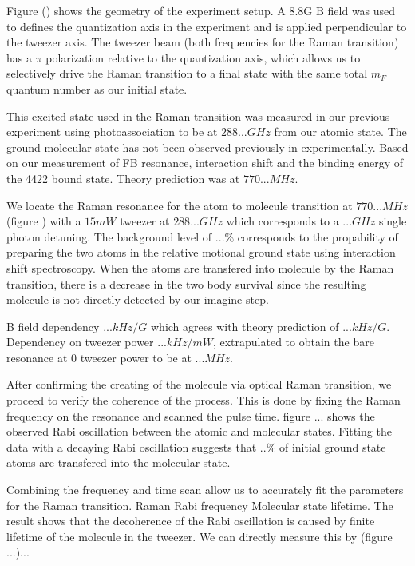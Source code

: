 \documentclass[aps,prl,twocolumn,groupedaddress]{revtex4-1}
\newcommand{\todo}[1]{}
\begin{document}
Figure () shows the geometry of the experiment setup. A $8.8\mathrm{G}$ B field was used to defines the quantization axis in the experiment and is applied perpendicular to the tweezer axis. The tweezer beam (both frequencies for the Raman transition) has a $\pi$ polarization relative to the quantization axis, which allows us to selectively drive the Raman transition to a final state with the same total $m_F$ quantum number as our initial state.


This excited state used in the Raman transition was measured in our previous experiment using photoassociation to be at $288... GHz$ from our atomic state. The ground molecular state has not been observed previously in experimentally. Based on our measurement of FB resonance, interaction shift and the binding energy of the 4422 bound state. Theory prediction was at $770... MHz$. \todo{more, mention/cite Jeremy}


We locate the Raman resonance for the atom to molecule transition at $770... MHz$ (figure \todo{}) with a $15 mW$ tweezer at $288... GHz$ which corresponds to a $... GHz$ single photon detuning.
The background level of $...\%$ corresponds to the propability of preparing the two atoms in the relative motional ground state using interaction shift spectroscopy. When the atoms are transfered into molecule by the Raman transition, there is a decrease in the two body survival since the resulting molecule is not directly detected by our imagine step.
\todo{more explanation of detection?}
\todo{FWHM of line??}

B field dependency $... kHz/G$ which agrees with theory prediction of $... kHz/G$.
Dependency on tweezer power $... kHz/mW$, extrapulated to obtain the bare resonance at $0$ tweezer power to be at $... MHz$.

After confirming the creating of the molecule via optical Raman transition, we proceed to verify the coherence of the process. This is done by fixing the Raman frequency on the resonance and scanned the pulse time. figure ... shows the observed Rabi oscillation between the atomic and molecular states. Fitting the data with a decaying Rabi oscillation suggests that $..\%$ of initial ground state atoms are transfered into the molecular state.

\todo{Atomic lifetime}

Combining the frequency and time scan allow us to accurately fit the parameters for the Raman transition.
Raman Rabi frequency
Molecular state lifetime.
The result shows that the decoherence of the Rabi oscillation is caused by finite lifetime of the molecule in the tweezer.
We can directly measure this by \todo{pulse sequence} (figure ...)...

\todo{Lifetime}

\todo{Fitting}

\todo{Scattering}


\end{document}
